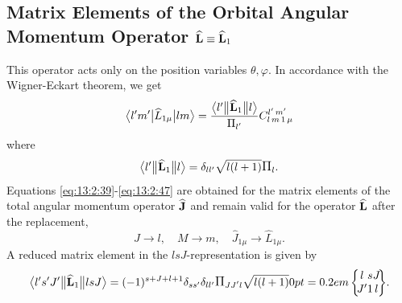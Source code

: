 \subsection{Matrix Elements of the Orbital Angular Momentum Operator \(\widehat{\mathbf{L}} \equiv \widehat{\mathbf{L}}_{1}\)}\label{sec:13.2.6}
This operator acts only on the position variables \(\theta, \varphi\). In accordance with the Wigner-Eckart theorem, we get
\begin{equation}
\braOket{ l^{\prime} m^{\prime}}{ \widehat{L}_{1 \mu}}{l m}=\frac{
\braOketred{ l^{\prime}}{\widehat{\vect{L}}_{1}}{ l}}{\Fact{l^{\prime}}} 
\clebsch{l}{m}{1}{\mu}{l^{\prime}}{m^{\prime}} \label{eq:13:2:66}
\end{equation}
where
\begin{equation}
\braOketred{ l^{\prime}}{\widehat{\vect{L}}_{1}}{ l}=\delta_{l l^\prime} \sqrt{l(l+1)}\Fact{l}. \label{eq:13:2:67}
\end{equation}
Equations \eqref{eq:13:2:39}-\eqref{eq:13:2:47} are obtained for the matrix elements of the total angular momentum operator \(\widehat{\mathbf{J}}\) and remain valid for the operator \(\widehat{\mathbf{L}}\) after the replacement,
\begin{equation*}
J \rightarrow l, \quad M \rightarrow m, \quad \widehat{J}_{1 \mu} \rightarrow \widehat{L}_{1 \mu}.
\end{equation*}
A reduced matrix element in the \(lsJ\)-representation is given by
\begin{equation}
\braOketred{ l^{\prime} s^{\prime} J^{\prime}}{\widehat{\vect{L}}_{1}}{ l s J}=(-1)^{s+J+l+1} \delta_{s s^{\prime}} \delta_{l l^{\prime}} \Fact{J J^{\prime} l} \sqrt{l(l+1)}
\sixj{l}{s}{J}{J^{\prime}}{1}{l}.\label{eq:13:2:68}
\end{equation}

